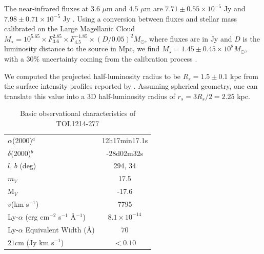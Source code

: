 \documentclass[a4,useAMS,usenatbib,usegraphicx]{mn2e}
\begin{document}
The near-infrared fluxes at $3.6$ $\mu$m and $4.5$ $\mu$m are
$7.71\pm0.55\times 10^{-5}$ Jy and $7.98\pm0.71\times 10^{-5}$ Jy
\citep{2008ApJ...678..804E}.  Using a conversion between fluxes and
stellar mass calibrated on the Large Magellanic Cloud $M_{\star} =
10^{5.65} \times F_{3.6}^{2.85} \times F_{4.5}^{-1.85} \times
(D/0.05)^2 M_{\odot}$, where fluxes are in Jy and $D$ is the luminosity
distance to the source in Mpc, we find $M_{\star} = 1.45\pm0.45\times 10^{8}
M_{\odot}$, with a $30\%$ uncertainty coming from the calibration
process \citep{2012AJ....143..139E}.  


We computed the projected half-luminosity radius to be $R_s=1.5\pm0.1$ kpc 
from the surface intensity profiles reported by \citep{2003A&A...410..481N}. 
Assuming spherical geometry, one can translate this value into a 3D
half-luminosity radius of $r_s=3R_s/2=2.25$ kpc.



\begin{table}
\begin{center}
\begin{tabular}{lc}\hline
$\alpha$(2000)$^{a}$ & 12h17min17.1s\\
$\delta$(2000)$^{b}$ & -28d02m32s\\
$l$, $b$ (deg) & 294, 34\\
$m_V$ & 17.5\\
  M$_V$ & -17.6\\ 
$v$(km s$^{-1}$) & 7795\\
Ly-$\alpha$ (erg cm$^{-2}$ s$^{-1}$ \AA$^{-1}$)& $8.1\times 10^{-14}$ \\
Ly-$\alpha$ Equivalent Width (\AA) & $70$\\
$21$cm (Jy km s$^{-1}$)& $<0.10$ \\\hline
\end{tabular}
\end{center}
\caption{Basic observational characteristics of TOL1214-277
  \citep{Thuan97}\label{obstable}} 
\end{table}
\end{document}
